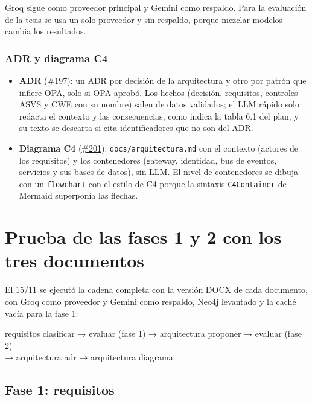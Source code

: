 \documentclass[11pt,a4paper]{report}
\newcommand{\pr}[1]{\href{https://github.com/PracticasESPE/Framework_Desarrollo_Seguro/pull/#1}{\##1}}
\begin{document}
Groq sigue como proveedor principal y Gemini como respaldo. Para la evaluación de la tesis se usa un
solo proveedor y sin respaldo, porque mezclar modelos cambia los resultados.

\subsection{ADR y diagrama C4}
\begin{itemize}
\item \textbf{ADR} (\pr{197}): un ADR por decisión de la arquitectura y otro por patrón que infiere
OPA, solo si OPA aprobó. Los hechos (decisión, requisitos, controles ASVS y CWE con su nombre) salen
de datos validados; el LLM rápido solo redacta el contexto y las consecuencias, como indica la
tabla 6.1 del plan, y su texto se descarta si cita identificadores que no son del ADR.
\item \textbf{Diagrama C4} (\pr{201}): \texttt{docs/arquitectura.md} con el contexto (actores de
los requisitos) y los contenedores (gateway, identidad, bus de eventos, servicios y sus bases de
datos), sin LLM. El nivel de contenedores se dibuja con un \texttt{flowchart} con el estilo de C4
porque la sintaxis \texttt{C4Container} de Mermaid superponía las flechas.
\end{itemize}

\chapter{Prueba de las fases 1 y 2 con los tres documentos}\label{cap:prueba}

El 15/11 se ejecutó la cadena completa con la versión DOCX de cada documento, con Groq como
proveedor y Gemini como respaldo, Neo4j levantado y la caché vacía para la fase 1:

\begin{center}
\small\ttfamily
requisitos clasificar → evaluar (fase 1) → arquitectura proponer → evaluar (fase 2)\\
→ arquitectura adr → arquitectura diagrama
\end{center}

\section{Fase 1: requisitos}
\end{document}
